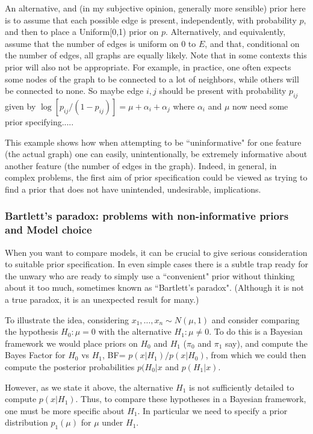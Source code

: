 \documentclass[12pt]{article}
\begin{document}
An alternative, and (in my subjective opinion, generally more sensible) prior here is to assume that each possible edge is present, independently, with probability $p$, and then to place a Uniform[0,1) prior on $p$.  Alternatively, and equivalently,
assume that the number of edges is uniform on $0$ to $E$, and that, conditional on the number of edges, all graphs are equally likely. Note that in some contexts this prior will also not be appropriate. For example, in practice, one often expects some nodes of the graph to be connected to a lot of neighbors, while others will be connected to none. So maybe edge $i,j$ should be present with probability $p_{ij}$ given by $\log[p_{ij}/(1-p_{ij})] = \mu+\alpha_i + \alpha_j$ where
$\alpha_i$ and $\mu$ now need some prior specifying.....

This example shows how when attempting to be ``uninformative" for one feature (the actual graph)
one can easily, unintentionally, be extremely informative about another feature (the number of edges in the graph). Indeed, in general, in complex problems, the first aim of prior specification could be viewed as trying to find a prior that does not have unintended, undesirable, implications.

\subsubsection{Bartlett's paradox: problems with non-informative priors and Model choice}

When you want to compare models, it can
be crucial to give serious consideration to
suitable prior specification.  In even simple cases there is a subtle trap ready for the unwary who
are ready to simply use a ``convenient" prior without
thinking about it too much, sometimes known as ``Bartlett's paradox". (Although it is not a true paradox, it is an
unexpected result for many.)

To illustrate the idea, considering
$x_1,\dots,x_n \sim N(\mu,1)$ and consider comparing the hypothesis $H_0: \mu=0$ with the alternative $H_1: \mu \neq 0$. 
To do this is a Bayesian framework we would
place priors on $H_0$ and $H_1$ ($\pi_0$ and $\pi_1$ say), and compute the Bayes Factor for $H_0$ vs $H_1$,
BF= $p(x | H_1)/p(x|H_0)$, from which we could
then compute the posterior probabilities $p(H_0|x$ and $p(H_1 | x)$. 

However, as we state it above, the alternative $H_1$ is not sufficiently  detailed to compute $p(x | H_1)$. Thus, to compare these hypotheses in a Bayesian framework, one must be more specific
about $H_1$. In particular we need to specify a prior distribution $p_1(\mu)$ for $\mu$ under $H_1$.
\end{document}
